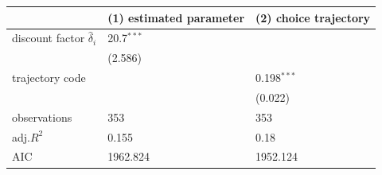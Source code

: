 \begin{tabular}{lll}
\hline
 & (1) estimated parameter & (2) choice trajectory \\
\hline
discount factor $\hat{\delta}_i$ & 20.7$^{***}$ &  \\
 & (2.586) &  \\
trajectory code &  & 0.198$^{***}$ \\
 &  & (0.022) \\
observations & 353 & 353 \\
adj.$R^2$ & 0.155 & 0.18 \\
AIC & 1962.824 & 1952.124 \\
\hline
\end{tabular}
